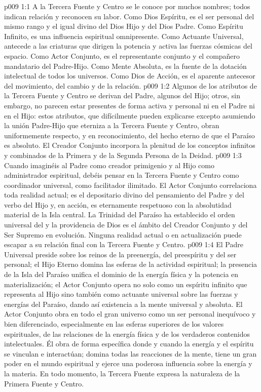 \vs p009 1:1 A la Tercera Fuente y Centro se le conoce por muchos nombres; todos indican relación y reconocen su labor. Como Dios Espíritu, es el ser personal del mismo rango y el igual divino del Dios Hijo y del Dios Padre. Como Espíritu Infinito, es una influencia espiritual omnipresente. Como Actuante Universal, antecede a las criaturas que dirigen la potencia y activa las fuerzas cósmicas del espacio. Como Actor Conjunto, es el representante conjunto y el compañero mandatario del Padre\hyp{}Hijo. Como Mente Absoluta, es la fuente de la dotación intelectual de todos los universos. Como Dios de Acción, es el aparente antecesor del movimiento, del cambio y de la relación.
\vs p009 1:2 Algunos de los atributos de la Tercera Fuente y Centro se derivan del Padre, algunos del Hijo; otros, sin embargo, no parecen estar presentes de forma activa y personal ni en el Padre ni en el Hijo: estos atributos, que difícilmente pueden explicarse excepto asumiendo la unión Padre\hyp{}Hijo que eterniza a la Tercera Fuente y Centro, obran uniformemente respecto, y en reconocimiento, del hecho eterno de que el Paraíso es absoluto. El Creador Conjunto incorpora la plenitud de los conceptos infinitos y combinados de la Primera y de la Segunda Persona de la Deidad.
\vs p009 1:3 \pc Cuando imaginéis al Padre como creador primigenio y al Hijo como administrador espiritual, debéis pensar en la Tercera Fuente y Centro como coordinador universal, como facilitador ilimitado. El Actor Conjunto correlaciona toda realidad actual; es el depositario divino del pensamiento del Padre y del verbo del Hijo y, en acción, es eternamente respetuoso con la absolutidad material de la Isla central. La Trinidad del Paraíso ha establecido el orden universal del  y la providencia de Dios es el ámbito del Creador Conjunto y del Ser Supremo en evolución. Ninguna realidad actual o en actualización puede escapar a su relación final con la Tercera Fuente y Centro.
\vs p009 1:4 \pc El Padre Universal preside sobre los reinos de la preenergía, del preespíritu y del ser personal; el Hijo Eterno domina las esferas de la actividad espiritual; la presencia de la Isla del Paraíso unifica el dominio de la energía física y la potencia en materialización; el Actor Conjunto opera no solo como un espíritu infinito que representa al Hijo sino también como actuante universal sobre las fuerzas y energías del Paraíso, dando así existencia a la mente universal y absoluta. El Actor Conjunto obra en todo el gran universo como un ser personal inequívoco y bien diferenciado, especialmente en las esferas superiores de los valores espirituales, de las relaciones de la energía física y de los verdaderos contenidos intelectuales. Él obra de forma específica donde y cuando la energía y el espíritu se vinculan e interactúan; domina todas las reacciones de la mente, tiene un gran poder en el mundo espiritual y ejerce una poderosa influencia sobre la energía y la materia. En todo momento, la Tercera Fuente expresa la naturaleza de la Primera Fuente y Centro.

